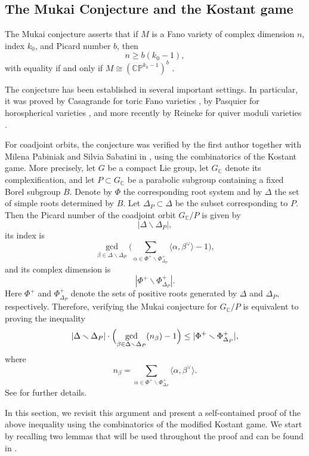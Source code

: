 \documentclass[11pt,a4paper]{amsart}
\theoremstyle{plain}
\theoremstyle{definition}
\theoremstyle{remark}
\begin{document}

\subsection{The Mukai Conjecture and the Kostant game}

The Mukai conjecture asserts that if $M$ is a Fano variety of complex dimension $n$, index $k_0$, and Picard number $b$, then
\[
n \geq b(k_0-1),
\]
with equality if and only if
$M \cong (\mathbb{CP}^{k_0-1})^b$
\cite{mukai}.

The conjecture has been established in several important settings. In particular, it was proved by Casagrande for toric Fano varieties \cite{casagrande2006}, by Pasquier for horospherical varieties \cite{pasquier}, and more recently by Reineke for quiver moduli varieties \cite{Reineke2024}.

For coadjoint orbits, the conjecture was verified by the first author together with Milena Pabiniak and Silvia Sabatini in \cite{CaviedesCastro2022}, using the combinatorics of the Kostant game.
More precisely, let $G$ be a compact Lie group, let $G_{\mathbb C}$ denote its complexification, and let $P \subset G_{\mathbb C}$ be a parabolic subgroup containing a fixed Borel subgroup $B$. Denote by $\Phi$ the corresponding root system and by $\Delta$ the set of simple roots determined by $B$. Let $\Delta_P \subset \Delta$ be the subset corresponding to $P$. Then the Picard number of the coadjoint orbit $G_{\mathbb C}/P$ is given by
\[
|\Delta \smallsetminus \Delta_P|,
\]
its index is
\[
\gcd_{\beta\in \Delta \smallsetminus \Delta_P}
\Biggl(
\sum_{\alpha\in \Phi^+\smallsetminus \Phi_{\Delta_P}^+}
\langle \alpha,\beta^\vee\rangle - 1
\Biggr),
\]
and its complex dimension is
\[
|\Phi^+\smallsetminus \Phi_{\Delta_P}^+|.
\]
Here $\Phi^+$ and $\Phi_{\Delta_P}^+$ denote the sets of positive roots generated by $\Delta$ and $\Delta_P$, respectively. Therefore, verifying the Mukai conjecture for $G_{\mathbb C}/P$ is equivalent to proving the inequality
\[
|\Delta \smallsetminus \Delta_P|\cdot
\Bigl(
\gcd_{\beta\in \Delta \smallsetminus \Delta_P}(n_\beta)-1
\Bigr)
\le
|\Phi^+\smallsetminus \Phi_{\Delta_P}^+|,
\]
where
\[
n_\beta=
\sum_{\alpha\in \Phi^+\smallsetminus \Phi_{\Delta_P}^+}
\langle \alpha,\beta^\vee\rangle.
\]
See \cite{CaviedesCastro2022} for further details.

In this section, we revisit this argument and present a self-contained proof of the above inequality using the combinatorics of the modified Kostant game.
We start by recalling two lemmas that will be used throughout the proof and can be found in \cite{Humphreys1972}.
\end{document}
